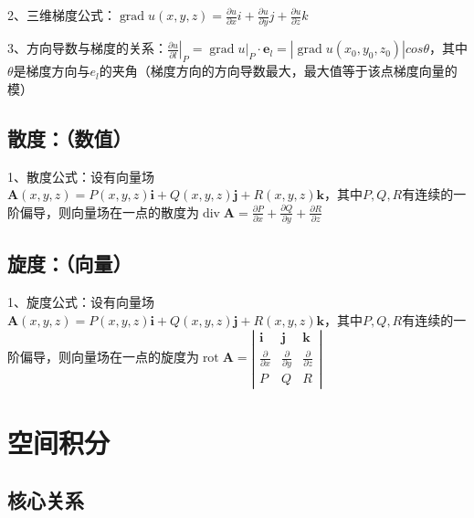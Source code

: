 2、三维梯度公式：$\operatorname{grad} u(x, y, z)=\frac{\partial u}{\partial x} i+\frac{\partial u}{\partial y} j+\frac{\partial u}{\partial z} k$

3、方向导数与梯度的关系：$\left.\frac{\partial u}{\partial{l}}\right|_{P}=\left.\operatorname{grad} u\right|_{P} \cdot \boldsymbol{e}_{l}=|\operatorname{grad} u(x_0, y_0, z_0) |cos \theta$，其中$\theta$是梯度方向与$e_l$的夹角（梯度方向的方向导数最大，最大值等于该点梯度向量的模）



\subsection{散度：（数值）}

1、散度公式：设有向量场$\boldsymbol{A}(x, y, z)=P(x, y, z) \boldsymbol{i}+Q(x, y, z) \boldsymbol{j}+R(x, y, z) \boldsymbol{k}$，其中$P,Q,R$有连续的一阶偏导，则向量场在一点的散度为$\operatorname{div} \boldsymbol{A}=\frac{\partial P}{\partial x}+\frac{\partial Q}{\partial y}+\frac{\partial R}{\partial z}$



\subsection{旋度：（向量）}

1、旋度公式：设有向量场$\boldsymbol{A}(x, y, z)=P(x, y, z) \boldsymbol{i}+Q(x, y, z) \boldsymbol{j}+R(x, y, z) \boldsymbol{k}$，其中$P,Q,R$有连续的一阶偏导，则向量场在一点的旋度为$\operatorname{rot} \boldsymbol{A}=\left|\begin{array}{ccc}\boldsymbol{i} & \boldsymbol{j} & \boldsymbol{k} \\\frac{\partial}{\partial x} & \frac{\partial}{\partial y} & \frac{\partial}{\partial z} \\P & Q & R\end{array}\right|$

\section{空间积分}



\subsection{核心关系}

